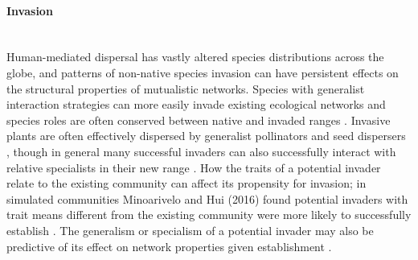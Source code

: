 \paragraph*{Invasion}\mbox{}\\
Human-mediated dispersal has vastly altered species distributions across the globe, and patterns of non-native species invasion can have persistent effects on the structural properties of mutualistic networks. Species with generalist interaction strategies can more easily invade existing ecological networks \parencite{piechnik2008food} and species roles are often conserved between native and invaded ranges \parencite{emer2016species}. Invasive plants are often effectively dispersed by generalist pollinators and seed dispersers \parencite{richardson2000plant}, though in general many successful invaders can also successfully interact with relative specialists in their new range \parencite{stouffer2014exotic}. How the traits of a potential invader relate to the existing community can affect its propensity for invasion; in simulated communities Minoarivelo and Hui (2016) found potential invaders with trait means different from the existing community were more likely to successfully establish \parencite{minoarivelo2016invading}. The generalism or specialism of a potential invader may also be predictive of its effect on network properties given establishment \parencite{russo2014patterns}.

